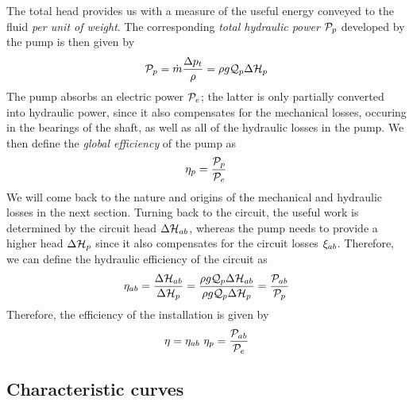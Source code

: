 The total head provides us with a measure of the useful energy
conveyed to the fluid \emph{per unit of weight}. The corresponding
\emph{total hydraulic power} $\mathcal P_p$ developed by the pump is then
given by
\begin{align*}
  \mathcal P_p = \dot m \frac{\Delta p_t}{\rho} = \rho g \mathcal Q_p \Delta \mathcal H_p 
\end{align*}
The pump absorbs an electric power $\mathcal P_e$; the latter is only
partially converted into hydraulic power, since it also compensates
for the mechanical losses, \eg occuring in the bearings of the shaft,
as well as all of the hydraulic losses in the pump. We then define the
\emph{global efficiency} of the pump as
\begin{align*}
  \eta_p = 
  \frac{\mathcal P_p}{\mathcal P_e}
\end{align*}
We will come back to the nature and origins of the mechanical and
hydraulic losses in the next section. Turning back to the circuit, the
useful work is determined by the circuit head $\Delta \mathcal H_{ab}$, whereas
the pump needs to provide a higher head $\Delta \mathcal H_p$ since it also
compensates for the circuit losses $\xi_{ab}$. Therefore, we can
define the hydraulic efficiency of the circuit as
\begin{align*}
  \eta_{ab} = \frac{\Delta \mathcal H_{ab}}{\Delta \mathcal H_p} = 
  \frac{\rho g \mathcal Q_p \Delta \mathcal H_{ab}}{\rho g \mathcal Q_p \Delta \mathcal H_p} =
  \frac{\mathcal P_{ab}}{\mathcal P_p}
\end{align*}
Therefore, the efficiency of the installation is given by
\begin{align*}
  \eta = \eta_{ab} ~\eta_p = \frac{\mathcal P_{ab}}{\mathcal P_e} 
\end{align*}

\subsection{Characteristic curves}

